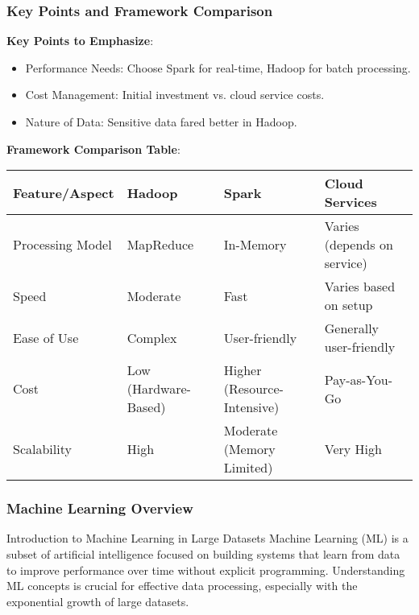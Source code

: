 \documentclass[aspectratio=169]{beamer}
\begin{document}
\begin{frame}[fragile]
    \frametitle{Key Points and Framework Comparison}
    \textbf{Key Points to Emphasize}:
    \begin{itemize}
        \item Performance Needs: Choose Spark for real-time, Hadoop for batch processing.
        \item Cost Management: Initial investment vs. cloud service costs.
        \item Nature of Data: Sensitive data fared better in Hadoop.
    \end{itemize}

    \textbf{Framework Comparison Table}:
    \begin{table}[]
        \begin{tabular}{|l|l|l|l|}
            \hline
            \textbf{Feature/Aspect} & \textbf{Hadoop} & \textbf{Spark} & \textbf{Cloud Services} \\ \hline
            Processing Model & MapReduce & In-Memory & Varies (depends on service) \\ \hline
            Speed & Moderate & Fast & Varies based on setup \\ \hline
            Ease of Use & Complex & User-friendly & Generally user-friendly \\ \hline
            Cost & Low (Hardware-Based) & Higher (Resource-Intensive) & Pay-as-You-Go \\ \hline
            Scalability & High & Moderate (Memory Limited) & Very High \\ \hline
        \end{tabular}
    \end{table}
\end{frame}

\begin{frame}[fragile]
    \frametitle{Machine Learning Overview}
    \begin{block}{Introduction to Machine Learning in Large Datasets}
        Machine Learning (ML) is a subset of artificial intelligence focused on building systems that learn from data to improve performance over time without explicit programming. Understanding ML concepts is crucial for effective data processing, especially with the exponential growth of large datasets.
    \end{block}
\end{frame}
\end{document}
